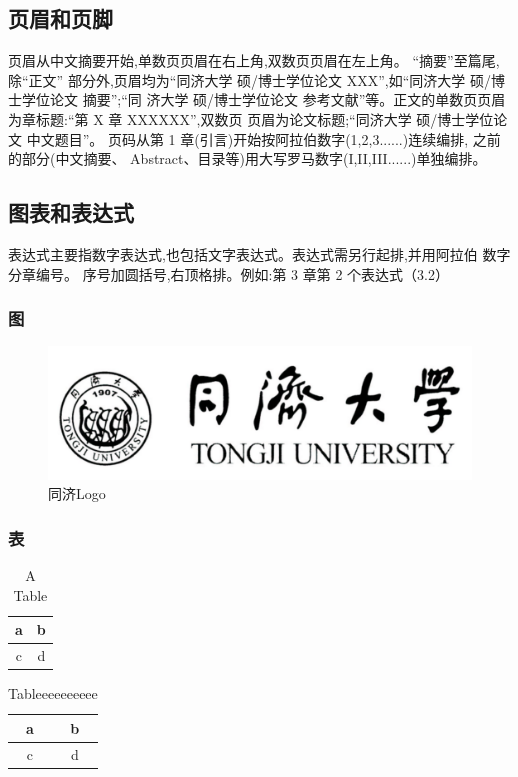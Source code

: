 	\subsection{页眉和页脚}
	页眉从中文摘要开始,单数页页眉在右上角,双数页页眉在左上角。
	“摘要”至篇尾,除“正文” 部分外,页眉均为“同济大学 
	硕/博士学位论文 XXX”,如“同济大学 硕/博士学位论文 摘要”;“同 济大学
	 硕/博士学位论文 参考文献”等。正文的单数页页眉为章标题:“第 X 章
	  XXXXXX”,双数页 页眉为论文标题;“同济大学 硕/博士学位论文 中文题目”。
页码从第 1 章(引言)开始按阿拉伯数字(1,2,3......)连续编排,
之前的部分(中文摘要、 Abstract、目录等)用大写罗马数字(I,II,III......)单独编排。



\subsection{图表和表达式}
	表达式主要指数字表达式,也包括文字表达式。表达式需另行起排,并用阿拉伯
	数字分章编号。 序号加圆括号,右顶格排。例如:第 3 章第 2 个表达式（3.2）
	
\subsubsection{图}
	\begin{figure}[h!]
		\centering
		\includegraphics[width=0.5\linewidth]{tongji-logo.png}
		\caption{同济Logo}
		\label{fig:tongji}
	\end{figure}

\subsubsection{表}
		\begin{table}[h!]
		\centering
			\caption{A Table}
			\begin{tabular}{c|c}
			a & b \\ \hline
			c & d \\ \hline
			\end{tabular}
		\end{table}
		
		\begin{table}[h!]
			\centering
				\caption{Tableeeeeeeeee}
				\label{tb:test_tb}
				\begin{tabular}{c|c}
				a & b \\ \hline
				c & d \\ \hline
				\end{tabular}
			\end{table}
	
